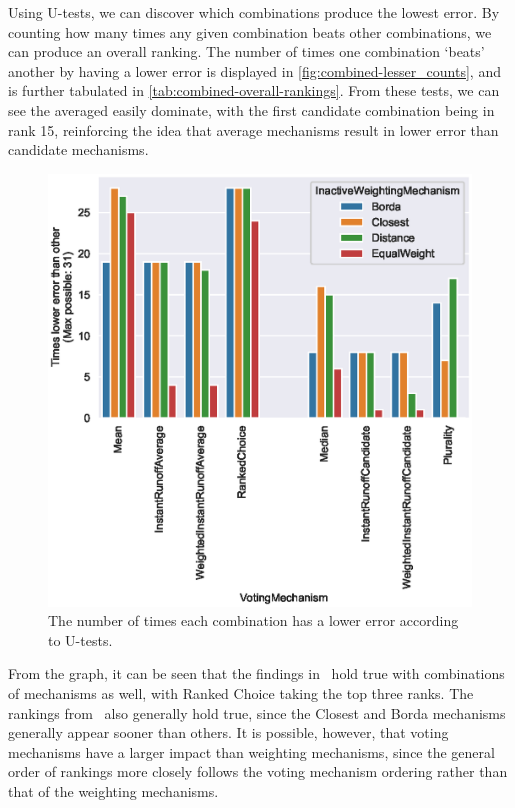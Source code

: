 Using U-tests, we can discover which combinations produce the lowest error.
By counting how many times any given combination beats other combinations, we can
produce an overall ranking.
The number of times one combination `beats' another by having a lower error is
displayed in \autoref{fig:combined-lesser_counts}, and is further tabulated in
\autoref{tab:combined-overall-rankings}.
From these tests, we can see the averaged easily dominate, with the first candidate
combination being in rank 15, reinforcing the idea that average mechanisms result in
lower error than candidate mechanisms.

\begin{figure}[htbp]
    \centering
    \includegraphics[scale=0.75]
    {./content/figures/combinations/combined_lesser_counts}
    \caption{The number of times each combination has a lower error according to
    U-tests.}
    \label{fig:combined-lesser_counts}
\end{figure}

From the graph, it can be seen that the findings
in~ hold true with combinations of
mechanisms as well, with Ranked Choice taking the top three ranks.
The rankings from~ also
generally hold true, since the Closest and Borda mechanisms generally
appear sooner than others.
It is possible, however, that voting mechanisms have a larger impact than weighting
mechanisms, since the general order of rankings more closely follows the voting
mechanism ordering rather than that of the weighting mechanisms.

